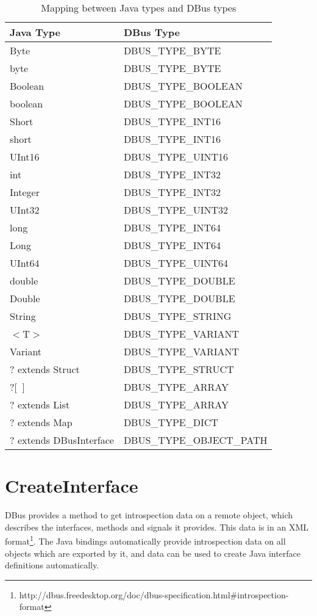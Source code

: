 \documentclass[a4paper,12pt]{article}
\begin{document}
\begin{table}
\begin{center}
\begin{tabular}{l|l}
\bf Java Type & \bf DBus Type \\
\hline
Byte	&	DBUS\_TYPE\_BYTE	\\
byte	&	DBUS\_TYPE\_BYTE	\\
Boolean	&	DBUS\_TYPE\_BOOLEAN	\\
boolean	&	DBUS\_TYPE\_BOOLEAN	\\
Short	&	DBUS\_TYPE\_INT16	\\
short	&	DBUS\_TYPE\_INT16	\\
UInt16	&	DBUS\_TYPE\_UINT16	\\
int	&	DBUS\_TYPE\_INT32	\\
Integer	&	DBUS\_TYPE\_INT32	\\
UInt32	&	DBUS\_TYPE\_UINT32	\\
long	&	DBUS\_TYPE\_INT64	\\
Long	&	DBUS\_TYPE\_INT64	\\
UInt64	&	DBUS\_TYPE\_UINT64	\\
double	&	DBUS\_TYPE\_DOUBLE	\\
Double	&	DBUS\_TYPE\_DOUBLE	\\
String	&	DBUS\_TYPE\_STRING	\\
$<$T$>$	&	DBUS\_TYPE\_VARIANT	\\
Variant	&	DBUS\_TYPE\_VARIANT	\\
? extends Struct	&	DBUS\_TYPE\_STRUCT	\\
?$[$~$]$	&	DBUS\_TYPE\_ARRAY	\\
? extends List	&	DBUS\_TYPE\_ARRAY	\\
? extends Map	&	DBUS\_TYPE\_DICT	\\
? extends DBusInterface	&	DBUS\_TYPE\_OBJECT\_PATH	\\
\end{tabular}
\end{center}
\caption{Mapping between Java types and DBus types}
\label{table:types}
\end{table}

\section{CreateInterface}
\label{sec:create}

DBus provides a method to get introspection data on a remote object,
which describes the interfaces, methods and signals it provides.
This data is in an XML
format\footnote{http://dbus.freedesktop.org/doc/dbus-specification.html\#introspection-format}.
The Java bindings automatically provide introspection data on all
objects which are exported by it, and data can be used to create
Java interface definitions automatically.
\end{document}
